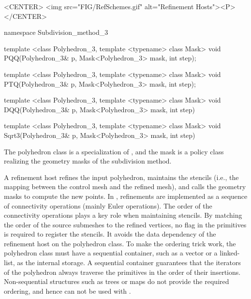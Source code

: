 \begin{ccHtmlOnly}
  <CENTER>
     <img src="FIG/RefSchemes.gif" alt="Refinement Hosts"><P>
  </CENTER>
\end{ccHtmlOnly}


\begin{ccExampleCode}
namespace Subdivision_method_3 {
  template <class Polyhedron_3, template <typename> class Mask>
  void PQQ(Polyhedron_3& p, Mask<Polyhedron_3> mask, int step);

  template <class Polyhedron_3, template <typename> class Mask>
  void PTQ(Polyhedron_3& p, Mask<Polyhedron_3> mask, int step);

  template <class Polyhedron_3, template <typename> class Mask>
  void DQQ(Polyhedron_3& p, Mask<Polyhedron_3> mask, int step)

  template <class Polyhedron_3, template <typename> class Mask>
  void Sqrt3(Polyhedron_3& p, Mask<Polyhedron_3> mask, int step)
}
\end{ccExampleCode}


The polyhedron class is a specialization of
, and the mask is a policy 
class realizing the geometry masks of the subdivision 
method.

A refinement host refines the input polyhedron, maintains 
the stencils (i.e., the mapping between the control mesh 
and the refined mesh), and calls the geometry masks
to compute the new points. 
In , refinements are implemented
as a sequence of connectivity operations (mainly Euler operations).
The order of the connectivity operations plays a key role when maintaining
stencils. By matching the order of the source submeshes to the refined 
vertices, no flag in the primitives is required to register the stencils. 
It avoids the data dependency of the refinement host on the polyhedron class. 
To make the ordering trick work, the polyhedron class must 
have a sequential container, such as a vector or a linked-list, as
the internal storage. 
A sequential container guarantees that the iterators of the 
polyhedron always traverse the primitives in the order of their 
insertions. Non-sequential structures such as 
trees or maps do not provide the required ordering, and hence
can not be used with .
 
